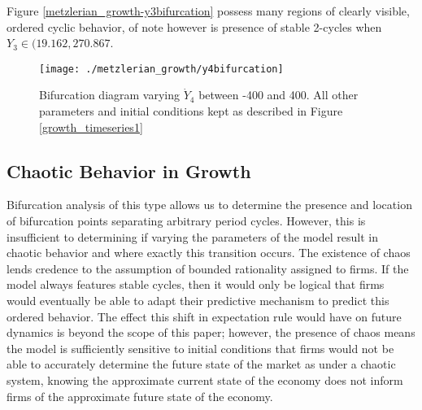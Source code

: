 Figure \ref{metzlerian_growth-y3bifurcation} possess many regions of clearly visible, ordered cyclic behavior, of note however is presence of stable 2-cycles when $Y_3\in (19.162, 270.867$.

\begin{figure}
    \centering
    \texttt{[image: ./metzlerian\_growth/y4bifurcation]}
    \caption{Bifurcation diagram varying $\dot Y_4$ between -400 and 400. All other parameters and initial conditions kept as described in Figure \ref{growth_timeseries1}}
    \label{metzlerian_growth-y4bifurcation}
\end{figure}

\subsection{Chaotic Behavior in Growth}
Bifurcation analysis of this type allows us to determine the presence and location of bifurcation points separating arbitrary period cycles. However, this is insufficient to determining if varying the parameters of the model result in chaotic behavior and where exactly this transition occurs. The existence of chaos lends credence to the assumption of bounded rationality assigned to firms. If the model always features stable cycles, then it would only be logical that firms would eventually be able to adapt their predictive mechanism to predict this ordered behavior. The effect this shift in expectation rule would have on future dynamics is beyond the scope of this paper; however, the presence of chaos means the model is sufficiently sensitive to initial conditions that firms would not be able to accurately determine the future state of the market as under a chaotic system, knowing the approximate current state of the economy does not inform firms of the approximate future state of the economy. 

